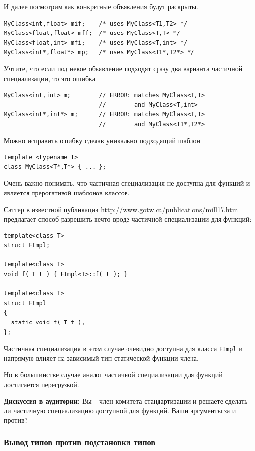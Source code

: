 \documentclass[a4paper,12pt,oneside]{article}
\begin{document}
И далее посмотрим как конкретные объявления будут раскрыты.

\begin{lstlisting}
MyClass<int,float> mif;    /* uses MyClass<T1,T2> */ 
MyClass<float,float> mff;  /* uses MyClass<T,T> */ 
MyClass<float,int> mfi;    /* uses MyClass<T,int> */ 
MyClass<int*,float*> mp;   /* uses MyClass<T1*,T2*> */
\end{lstlisting}

Учтите, что если под некое объявление подходят сразу два варианта частичной специализации, то это ошибка

\begin{lstlisting}
MyClass<int,int> m;        // ERROR: matches MyClass<T,T> 
                           //        and MyClass<T,int> 
MyClass<int*,int*> m;      // ERROR: matches MyClass<T,T> 
                           //        and MyClass<T1*,T2*>
\end{lstlisting}

Можно исправить ошибку сделав уникально подходящий шаблон

\begin{lstlisting}
template <typename T> 
class MyClass<T*,T*> { ... };
\end{lstlisting}

Очень важно понимать, что частичная специализация не доступна для функций и является прерогативой шаблонов классов.

Саттер в известной публикации \url{http://www.gotw.ca/publications/mill17.htm} предлагает способ разрешить нечто вроде частичной специализации для функций:

\begin{lstlisting}
template<class T> 
struct FImpl;

template<class T> 
void f( T t ) { FImpl<T>::f( t ); } 

template<class T> 
struct FImpl 
{ 
  static void f( T t ); 
};
\end{lstlisting}

Частичная специализация в этом случае очевидно доступна для класса \lstinline!FImpl! и напрямую влияет на зависимый тип статической функции-члена.

Но в большинстве случае аналог частичной специализации для функций достигается перегрузкой.

\textbf{Дискуссия в аудитории:} Вы -- член комитета стандартизации и решаете сделать ли частичную специализацию доступной для функций. Ваши аргументы за и против?

\subsubsection{Вывод типов против подстановки типов}
\end{document}
